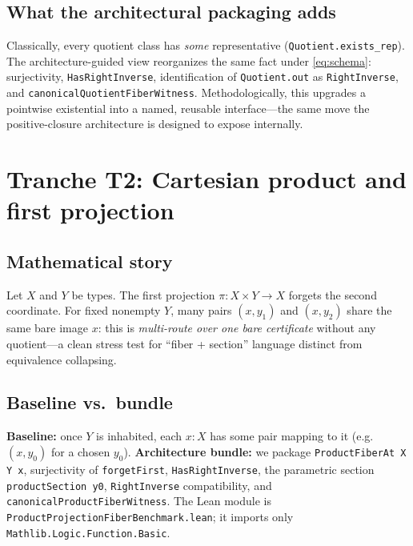 \documentclass[11pt]{article}
\begin{document}
\subsection{What the architectural packaging adds}\label{sec:t1-pack}

Classically, every quotient class has \emph{some} representative (\texttt{Quotient.exists\_rep}).
The architecture-guided view reorganizes the same fact under \eqref{eq:schema}: surjectivity,
\texttt{HasRightInverse}, identification of \texttt{Quotient.out} as \texttt{RightInverse}, and
\texttt{canonicalQuotientFiberWitness}. Methodologically, this upgrades a pointwise existential
into a named, reusable interface---the same move the positive-closure architecture is designed
to expose internally.

\section{Tranche T2: Cartesian product and first projection}\label{sec:t2}

\subsection{Mathematical story}

Let $X$ and $Y$ be types. The first projection $\pi : X \times Y \to X$ forgets the second
coordinate. For fixed nonempty $Y$, many pairs $(x,y_1)$ and $(x,y_2)$ share the same bare
image $x$: this is \emph{multi-route over one bare certificate} without any quotient---a
clean stress test for ``fiber + section'' language distinct from equivalence collapsing.

\subsection{Baseline vs.\ bundle}

\textbf{Baseline:} once $Y$ is inhabited, each $x : X$ has some pair mapping to it (e.g.\
$(x,y_0)$ for a chosen $y_0$). \textbf{Architecture bundle:} we package
\texttt{ProductFiberAt X Y x}, surjectivity of \texttt{forgetFirst}, \texttt{HasRightInverse},
the parametric section \texttt{productSection y0}, \texttt{RightInverse} compatibility, and
\texttt{canonicalProductFiberWitness}. The Lean module is
\texttt{ProductProjectionFiberBenchmark.lean}; it imports only
\texttt{Mathlib.Logic.Function.Basic}.
\end{document}
